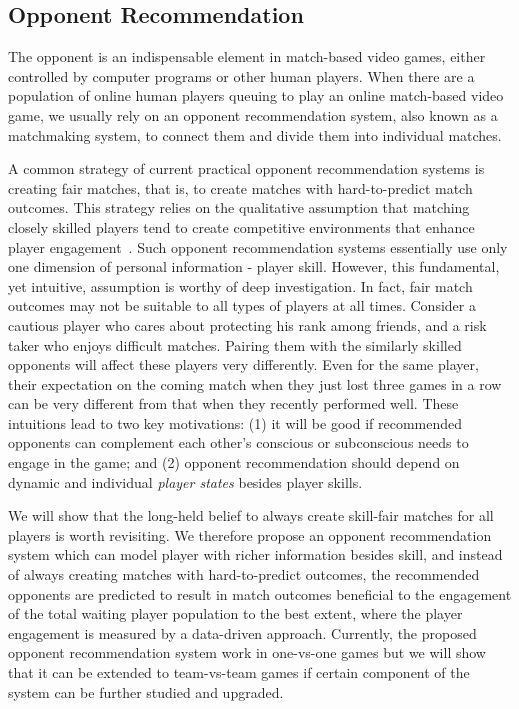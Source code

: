 \subsection{Opponent Recommendation}

The opponent is an indispensable element in match-based video games, either controlled by computer programs or other human players. When there are a population of online human players queuing to play an online match-based video game, we usually rely on an opponent recommendation system, also known as a matchmaking system, to connect them and divide them into individual matches. 

A common strategy of current practical opponent recommendation systems is creating fair matches, that is, to create matches with hard-to-predict match outcomes. This strategy relies on the qualitative assumption that matching closely skilled players tend to create competitive environments that enhance player engagement~\cite{sweetser2005gameflow,flow1990psychology,chen2007flow,graepel2006ranking}. Such opponent recommendation systems essentially use only one dimension of personal information - player skill. However, this fundamental, yet intuitive, assumption is worthy of deep investigation. In fact, fair match outcomes may not be suitable to all types of players at all times. Consider a cautious player who cares about protecting his rank among friends, and a risk taker who enjoys difficult matches. Pairing them with the similarly skilled opponents will affect these players very differently. Even for the same player, their expectation on the coming match when they just lost three games in a row can be very different from that when they recently performed well. These intuitions lead to two key motivations: (1) it will be good if recommended opponents can complement each other's conscious or subconscious needs to engage in the game; and (2) opponent recommendation should depend on dynamic and individual \emph{player states} besides player skills.

We will show that the long-held belief to always create skill-fair matches for all players is worth revisiting. We therefore propose an opponent recommendation system which can model player with richer information besides skill, and instead of always creating matches with hard-to-predict outcomes, the recommended opponents are predicted to result in match outcomes beneficial to the engagement of the total waiting player population to the best extent, where the player engagement is measured by a data-driven approach. Currently, the proposed opponent recommendation system work in one-vs-one games but we will show that it can be extended to team-vs-team games if certain component of the system can be further studied and upgraded.  



